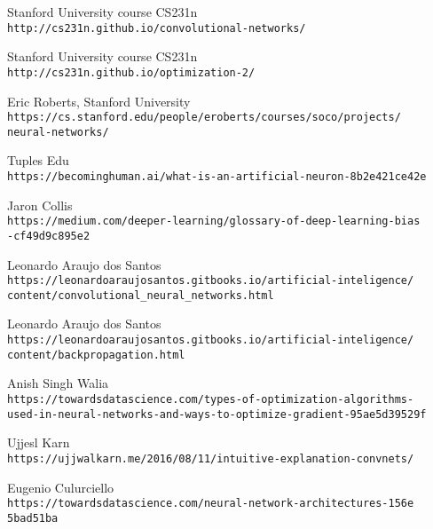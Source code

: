 \begin{thebibliography}{99}

Stanford University course CS231n
\\\texttt{http://cs231n.github.io/convolutional-networks/}

Stanford University course CS231n
\\\texttt{http://cs231n.github.io/optimization-2/}

Eric Roberts, Stanford University
\\\texttt{https://cs.stanford.edu/people/eroberts/courses/soco/projects/\\neural-networks/}

Tuples Edu
\\\texttt{https://becominghuman.ai/what-is-an-artificial-neuron-8b2e421ce42e}

Jaron Collis
\\\texttt{https://medium.com/deeper-learning/glossary-of-deep-learning-bias\\-cf49d9c895e2}

Leonardo Araujo dos Santos
\\\texttt{https://leonardoaraujosantos.gitbooks.io/artificial-inteligence/\\content/convolutional\_neural\_networks.html}

Leonardo Araujo dos Santos
\\\texttt{https://leonardoaraujosantos.gitbooks.io/artificial-inteligence/\\content/backpropagation.html}

Anish Singh Walia
\\\texttt{https://towardsdatascience.com/types-of-optimization-algorithms-\\used-in-neural-networks-and-ways-to-optimize-gradient-95ae5d39529f}

Ujjesl Karn
\\\texttt{https://ujjwalkarn.me/2016/08/11/intuitive-explanation-convnets/}

Eugenio Culurciello
\\\texttt{https://towardsdatascience.com/neural-network-architectures-156e\\5bad51ba}


\end{thebibliography}
